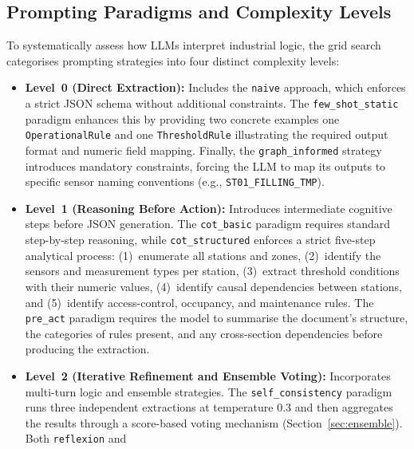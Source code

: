 \documentclass[11pt]{article}
\begin{document}
\subsection{Prompting Paradigms and Complexity Levels}
To systematically assess how LLMs interpret industrial logic, the grid search
categorises prompting strategies into four distinct complexity levels:

\begin{itemize}
    \item \textbf{Level~0 (Direct Extraction):} Includes the \texttt{naive} approach,
          which enforces a strict JSON schema without additional constraints.
          The \texttt{few\_shot\_static} paradigm enhances this by providing two
          concrete examples one \texttt{OperationalRule} and one
          \texttt{ThresholdRule} illustrating the required output format and numeric
          field mapping. Finally, the \texttt{graph\_informed} strategy introduces
          mandatory constraints, forcing the LLM to map its outputs to specific sensor
          naming conventions (e.g., \texttt{ST01\_FILLING\_TMP}).
    \item \textbf{Level~1 (Reasoning Before Action):} Introduces intermediate
          cognitive steps before JSON generation. The \texttt{cot\_basic} paradigm
          requires standard step-by-step reasoning, while \texttt{cot\_structured}
          enforces a strict five-step analytical process: (1)~enumerate all stations
          and zones, (2)~identify the sensors and measurement types per station,
          (3)~extract threshold conditions with their numeric values,
          (4)~identify causal dependencies between stations, and
          (5)~identify access-control, occupancy, and maintenance rules.
          The \texttt{pre\_act} paradigm requires the model to summarise the
          document's structure, the categories of rules present, and any
          cross-section dependencies before producing the extraction.
    \item \textbf{Level~2 (Iterative Refinement and Ensemble Voting):} Incorporates
          multi-turn logic and ensemble strategies. The \texttt{self\_consistency}
          paradigm runs three independent extractions at temperature $0.3$ and then
          aggregates the results through a score-based voting mechanism
          (Section~\ref{sec:ensemble}). Both \texttt{reflexion} and

\end{itemize}
\end{document}
